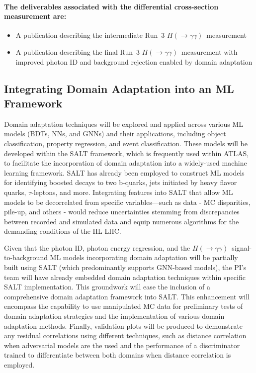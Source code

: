 \documentclass[letter, USenglish, 11pt, subfigure]{article}
\newcommand{\hyy}{\ensuremath{H(\to\gamma\gamma)}}
\begin{document}
\paragraph{The deliverables associated with the differential cross-section measurement are:}
\begin{itemize}
\item A publication describing the intermediate Run~3 \hyy\ measurement
\item A publication describing the final Run~3 \hyy\ measurement with improved photon ID and background rejection enabled by domain adaptation
\end{itemize}

\subsection{Integrating Domain Adaptation into an ML Framework}

Domain adaptation techniques will be explored and applied across various ML models (BDTs, NNs, and GNNs) and their applications, including object classification, property regression, and event classification. These models will be developed within the SALT framework, which is frequently used within ATLAS, to facilitate the incorporation of domain adaptation into a widely-used machine learning framework. SALT has already been employed to construct ML models for identifying boosted decays to two b-quarks, jets initiated by heavy flavor quarks, $\tau$-leptons, and more. Integrating features into SALT that allow ML models to be decorrelated from specific variables—such as data - MC disparities, pile-up, and others - would reduce uncertainties stemming from discrepancies between recorded and simulated data and equip numerous algorithms for the demanding conditions of the HL-LHC.

Given that the photon ID, photon energy regression, and the \hyy\ signal-to-background ML models incorporating domain adaptation will be partially built using SALT (which predominantly supports GNN-based models), the PI's team will have already embedded domain adaptation techniques within specific SALT implementation. This groundwork will ease the inclusion of a comprehensive domain adaptation framework into SALT. This enhancement will encompass the capability to use manipulated MC data for preliminary tests of domain adaptation strategies and the implementation of various domain adaptation methods. Finally, validation plots will be produced to demonstrate any residual correlations using different techniques, such as distance correlation when adversarial models are the used and the performance of a discriminator trained to differentiate between both domains when distance correlation is employed.
\end{document}

